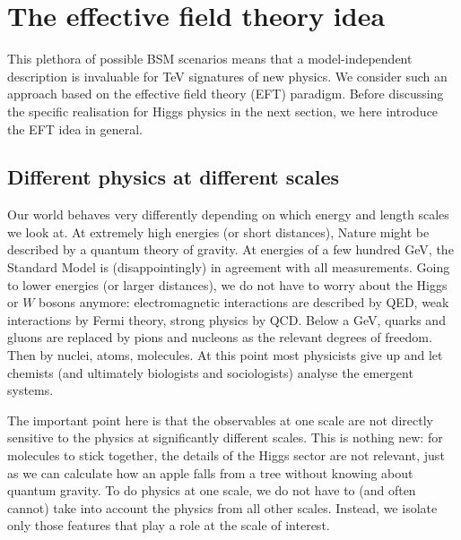 \section{The effective field theory idea}
\label{sec:foundations_eft}

This plethora of possible BSM scenarios means that a model-independent
description is invaluable for TeV signatures of new physics. We
consider such an approach based on the effective field theory (EFT)
paradigm. Before discussing the specific realisation for Higgs physics
in the next section, we here introduce the EFT idea in general.




\subsection{Different physics at different scales}
\label{sec:foundations_scales}

Our world behaves very differently depending on which energy and
length scales we look at. At extremely high energies (or short
distances), Nature might be described by a quantum theory of
gravity. At energies of a few hundred GeV, the Standard Model is
(disappointingly) in agreement with all measurements. Going to lower
energies (or larger distances), we do not have to worry about the Higgs or
$W$ bosons anymore: electromagnetic interactions are described by QED,
weak interactions by Fermi theory, strong physics by QCD. Below a GeV,
quarks and gluons are replaced by pions and nucleons as the relevant
degrees of freedom. Then by nuclei, atoms, molecules. At this point
most physicists give up and let chemists (and ultimately biologists
and sociologists) analyse the emergent systems.

The important point here is that the observables at one scale are not
directly sensitive to the physics at significantly different
scales. This is nothing new: for molecules to stick together, the
details of the Higgs sector are not relevant, just as we can calculate how
an apple falls from a tree without knowing about quantum gravity. To
do physics at one scale, we do not have to (and often cannot) take
into account the physics from all other scales. Instead, we isolate
only those features that play a role at the scale of interest.

